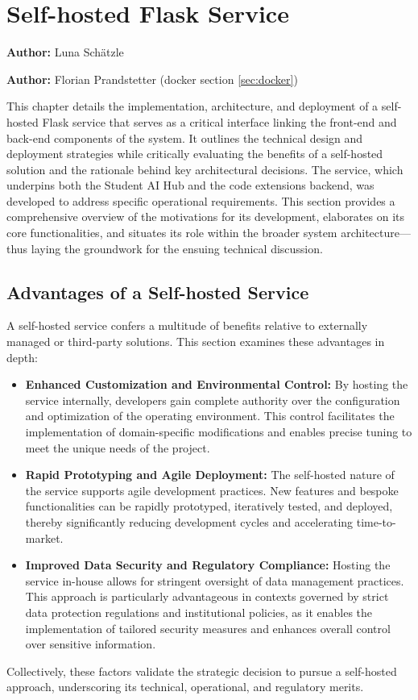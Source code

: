 \chapter{Self-hosted Flask Service}
\label{cha:hosted_flask_service}
\textbf{Author:} Luna Schätzle

\textbf{Author:} Florian Prandstetter (docker section \ref{sec:docker})

This chapter details the implementation, architecture, and deployment of a self-hosted Flask service that serves as a critical 
interface linking the front-end and back-end components of the system. It outlines the technical design and deployment strategies 
while critically evaluating the benefits of a self-hosted solution and the rationale behind key architectural decisions. The service, 
which underpins both the Student AI Hub and the code extensions backend, was developed to address specific operational requirements. 
This section provides a comprehensive overview of the motivations for its development, elaborates on its core functionalities, 
and situates its role within the broader system architecture—thus laying the groundwork for the ensuing technical discussion.


\section{Advantages of a Self-hosted Service}
A self-hosted service confers a multitude of benefits relative to externally managed or third-party solutions. This section examines these advantages in depth:
\begin{itemize}
    \item \textbf{Enhanced Customization and Environmental Control:} By hosting the service internally, developers gain complete authority over the configuration and optimization of the operating environment. This control facilitates the implementation of domain-specific modifications and enables precise tuning to meet the unique needs of the project.
    \item \textbf{Rapid Prototyping and Agile Deployment:} The self-hosted nature of the service supports agile development practices. New features and bespoke functionalities can be rapidly prototyped, iteratively tested, and deployed, thereby significantly reducing development cycles and accelerating time-to-market.
    \item \textbf{Improved Data Security and Regulatory Compliance:} Hosting the service in-house allows for stringent oversight of data management practices. This approach is particularly advantageous in contexts governed by strict data protection regulations and institutional policies, as it enables the implementation of tailored security measures and enhances overall control over sensitive information.
\end{itemize}
Collectively, these factors validate the strategic decision to pursue a self-hosted approach, underscoring its technical, operational, and regulatory merits.

